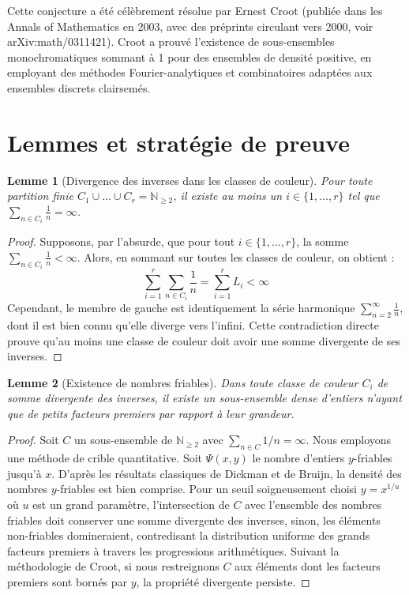 \documentclass[12pt,a4paper]{article}
\newtheorem{lemma}{Lemme}
\begin{document}
Cette conjecture a \'et\'e c\'el\`ebrement r\'esolue par Ernest Croot (publi\'ee dans les Annals of Mathematics en 2003, avec des pr\'eprints circulant vers 2000, voir arXiv:math/0311421). Croot a prouv\'e l'existence de sous-ensembles monochromatiques sommant \`a 1 pour des ensembles de densit\'e positive, en employant des m\'ethodes Fourier-analytiques et combinatoires adapt\'ees aux ensembles discrets clairsem\'es.

\section{Lemmes et strat\'egie de preuve}

\begin{lemma}[Divergence des inverses dans les classes de couleur]
Pour toute partition finie $C_1 \cup \dots \cup C_r = \mathbb{N}_{\geq 2}$, il existe au moins un $i \in \{1, \dots, r\}$ tel que $\sum_{n \in C_i} \frac{1}{n} = \infty$.
\end{lemma}
\begin{proof}
Supposons, par l'absurde, que pour tout $i \in \{1, \dots, r\}$, la somme $\sum_{n \in C_i} \frac{1}{n} < \infty$.
Alors, en sommant sur toutes les classes de couleur, on obtient :
\begin{equation}
\sum_{i=1}^r \sum_{n \in C_i} \frac{1}{n} = \sum_{i=1}^r L_i < \infty
\end{equation}
Cependant, le membre de gauche est identiquement la s\'erie harmonique $\sum_{n=2}^\infty \frac{1}{n}$, dont il est bien connu qu'elle diverge vers l'infini.
Cette contradiction directe prouve qu'au moins une classe de couleur doit avoir une somme divergente de ses inverses.
\end{proof}

\begin{lemma}[Existence de nombres friables]
Dans toute classe de couleur $C_i$ de somme divergente des inverses, il existe un sous-ensemble dense d'entiers n'ayant que de petits facteurs premiers par rapport \`a leur grandeur.
\end{lemma}
\begin{proof}
Soit $C$ un sous-ensemble de $\mathbb{N}_{\geq 2}$ avec $\sum_{n \in C} 1/n = \infty$. Nous employons une m\'ethode de crible quantitative. Soit $\Psi(x, y)$ le nombre d'entiers $y$-friables jusqu'\`a $x$. D'apr\`es les r\'esultats classiques de Dickman et de Bruijn, la densit\'e des nombres $y$-friables est bien comprise. Pour un seuil soigneusement choisi $y = x^{1/u}$ o\`u $u$ est un grand param\`etre, l'intersection de $C$ avec l'ensemble des nombres friables doit conserver une somme divergente des inverses, sinon, les \'el\'ements non-friables domineraient, contredisant la distribution uniforme des grands facteurs premiers \`a travers les progressions arithm\'etiques. Suivant la m\'ethodologie de Croot, si nous restreignons $C$ aux \'el\'ements dont les facteurs premiers sont born\'es par $y$, la propri\'et\'e divergente persiste.
\end{proof}
\end{document}
